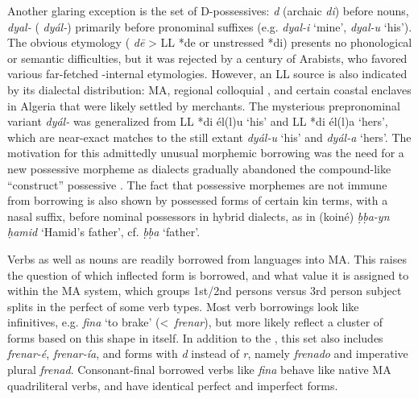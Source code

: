 \documentclass[output=paper]{langsci/langscibook}
\begin{document}
Another glaring exception is the set of D-possessives: \textit{d} (archaic \textit{di}) before nouns, \textit{dyal-} ( \textit{dyál-}) primarily before pronominal suffixes (e.g. \textit{dyal-i} ‘mine’, \textit{dyal-u} ‘his’). The obvious etymology ( \textit{dē} > LL *de or unstressed *di) presents no phonological or semantic difficulties, but it was rejected by a century of  Arabists, who favored various far-fetched -internal etymologies. However, an LL source is also indicated by its dialectal distribution:  MA, regional colloquial  , and certain coastal enclaves in Algeria that were likely settled by  merchants. The mysterious prepronominal variant \textit{dyál-} was generalized from LL *di él(l)u ‘his’ and LL *di él(l)a ‘hers’, which are near-exact matches to the still extant  \textit{dyál-u} ‘his’ and \textit{dyál-a} ‘hers’. The motivation for this admittedly unusual morphemic borrowing was the need for a new possessive morpheme as  dialects gradually abandoned the compound-like  “construct” possessive \citep{Heath2015}. The fact that possessive morphemes are not immune from borrowing is also shown by possessed forms of certain kin terms, with a  nasal suffix, before nominal possessors in hybrid dialects, as in (koiné) \textit{ḅḅa-yn} \textit{ḥamid} ‘Hamid’s father’, cf. \textit{ḅḅa} ‘father’. 

Verbs as well as nouns are readily borrowed from  languages into MA. This raises the question of which  inflected form is borrowed, and what value it is assigned to within the MA  system, which groups 1st/2nd persons versus 3rd person subject splits in the perfect of some verb types. Most  verb borrowings look like  infinitives, e.g. \textit{f{\R}ina{\R}} ‘to brake’ (<~\textit{frenar}), but more likely reflect a cluster of forms based on this  shape in  itself. In addition to the , this set also includes  \textit{frenar-é},  \textit{frenar-ía}, and forms with \textit{d} instead of \textit{r}, namely  \textit{frenado} and imperative plural \textit{frenad}. Consonant-final borrowed verbs like \textit{f{\R}ina{\R}} behave like native MA quadriliteral verbs, and have identical perfect and imperfect forms. 
\end{document}
